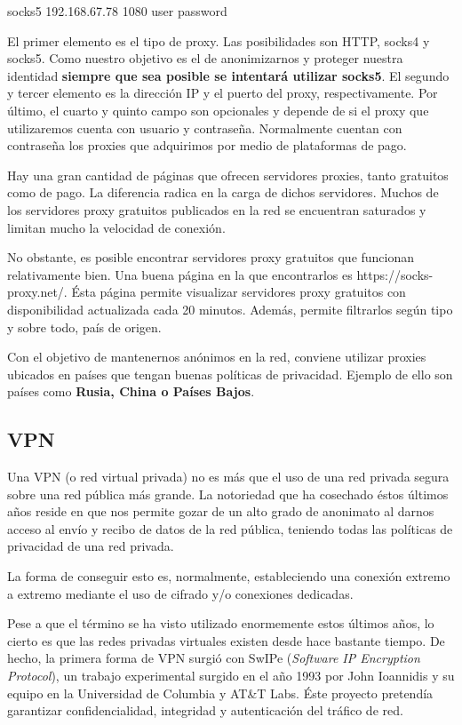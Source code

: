 {\selectfont 
	socks5  192.168.67.78   1080    user   password
}

El primer elemento es el tipo de proxy. Las posibilidades son HTTP,
socks4 y socks5. Como nuestro objetivo es el de anonimizarnos y
proteger nuestra identidad \textbf{siempre que sea posible se
  intentará utilizar socks5}.  El segundo y tercer elemento es la
dirección IP y el puerto del proxy, respectivamente.  Por último, el
cuarto y quinto campo son opcionales y depende de si el proxy que
utilizaremos cuenta con usuario y contraseña. Normalmente cuentan con
contraseña los proxies que adquirimos por medio de plataformas de
pago.

Hay una gran cantidad de páginas que ofrecen servidores proxies, tanto
gratuitos como de pago. La diferencia radica en la carga de dichos
servidores. Muchos de los servidores proxy gratuitos publicados en la
red se encuentran saturados y limitan mucho la velocidad de conexión.

No obstante, es posible encontrar servidores proxy gratuitos que
funcionan relativamente bien. Una buena página en la que encontrarlos
es https://socks-proxy.net/.  Ésta página permite visualizar
servidores proxy gratuitos con disponibilidad actualizada cada 20
minutos. Además, permite filtrarlos según tipo y sobre todo, país de
origen.

Con el objetivo de mantenernos anónimos en la red, conviene utilizar
proxies ubicados en países que tengan buenas políticas de
privacidad. Ejemplo de ello son países como \textbf{Rusia, China o
  Países Bajos}.

\subsection{VPN}

Una VPN (o red virtual privada) no es más que el uso de una red
privada segura sobre una red pública más grande.  La notoriedad que ha
cosechado éstos últimos años reside en que nos permite gozar de un
alto grado de anonimato al darnos acceso al envío y recibo de datos de
la red pública, teniendo todas las políticas de privacidad de una red
privada.

La forma de conseguir esto es, normalmente, estableciendo una conexión extremo a extremo mediante el uso de cifrado y/o conexiones dedicadas.

Pese a que el término se ha visto utilizado enormemente estos últimos
años, lo cierto es que las redes privadas virtuales existen desde hace
bastante tiempo.  De hecho, la primera forma de VPN surgió con SwIPe
(\textit{Software IP Encryption Protocol}), un trabajo experimental
surgido en el año 1993 por John Ioannidis y su equipo en la
Universidad de Columbia y AT\&T Labs. Éste proyecto pretendía
garantizar confidencialidad, integridad y autenticación del tráfico de
red.

